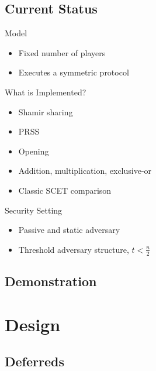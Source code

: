 \documentclass[t,noamsthm]{beamer}
\begin{document}
\subsection{Current Status}

\begin{frame}{Model}

  \begin{itemize}
  \item Fixed number of players
  \item Executes a symmetric protocol
  \end{itemize}

\end{frame}

\begin{frame}{What is Implemented?}

  \begin{itemize}
  \item Shamir sharing
  \item PRSS
  \item Opening
  \item Addition, multiplication, exclusive-or
  \item Classic SCET comparison
  \end{itemize}

\end{frame}

\begin{frame}{Security Setting}

  \begin{itemize}
  \item Passive and static adversary
  \item Threshold adversary structure, $t < \frac n 2$
  \end{itemize}

\end{frame}





\subsection{Demonstration}




\section{Design}

\subsection{Deferreds}
\end{document}
